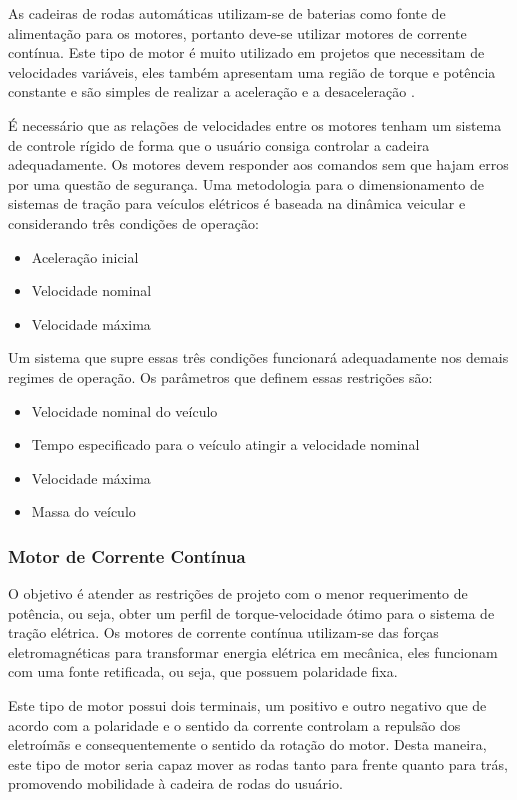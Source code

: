As cadeiras de rodas automáticas utilizam-se de baterias como fonte de alimentação para os motores, portanto deve-se utilizar motores de corrente contínua. Este tipo de motor é muito utilizado em projetos que necessitam de velocidades variáveis, eles também apresentam uma região de torque e potência constante e são simples de realizar a aceleração e a desaceleração \cite{manual_bateria_unipower}.

É necessário que as relações de velocidades entre os motores tenham um sistema de controle rígido de forma que o usuário consiga controlar a cadeira adequadamente. Os motores devem responder aos comandos sem que hajam erros por uma questão de segurança. Uma metodologia para o dimensionamento de sistemas de tração para veículos elétricos é baseada na dinâmica veicular e considerando três condições de operação:

\begin{itemize}
	\item Aceleração inicial
	\item Velocidade nominal
	\item Velocidade máxima
\end{itemize}

Um sistema que supre essas três condições funcionará adequadamente nos demais regimes de operação. Os parâmetros que definem essas restrições são:

\begin{itemize}
	\item Velocidade nominal do veículo
    \item Tempo especificado para o veículo atingir a velocidade nominal
    \item Velocidade máxima
    \item Massa do veículo
\end{itemize}

\subsubsection{Motor de Corrente Contínua}

O objetivo é atender as restrições de projeto com o menor requerimento de potência, ou seja, obter um perfil de torque-velocidade ótimo para o sistema de tração elétrica. Os motores de corrente contínua utilizam-se das forças eletromagnéticas para transformar energia elétrica em mecânica, eles funcionam com uma fonte retificada, ou seja, que possuem polaridade fixa.

Este tipo de motor possui dois terminais, um positivo e outro negativo que de acordo com a polaridade e o sentido da corrente controlam a repulsão dos eletroímãs e consequentemente o sentido da rotação do motor. Desta maneira, este tipo de motor seria capaz mover as rodas tanto para frente quanto para trás, promovendo mobilidade à cadeira de rodas do usuário.

